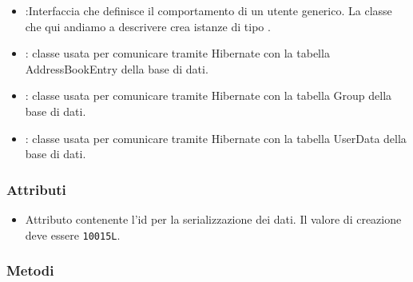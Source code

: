 \begin{itemize}
	\item {}:Interfaccia che definisce il comportamento di un utente generico. La classe che qui andiamo a descrivere crea istanze di tipo .
	\item {}: classe usata per comunicare tramite Hibernate con la tabella AddressBookEntry della base di dati.
	\item {}: classe usata per comunicare tramite Hibernate con la tabella Group della base di dati.
	\item {}: classe usata per comunicare tramite Hibernate con la tabella UserData della base di dati.
\end{itemize}

\subsubsection*{Attributi}

\begin{itemize}
	\item{}
	Attributo contenente l'id per la serializzazione dei dati. Il valore di creazione deve essere \texttt{10015L}.
\end{itemize}

\subsubsection*{Metodi}

